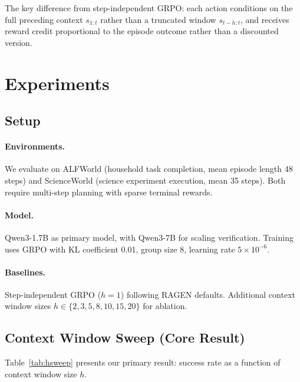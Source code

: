 \documentclass[11pt]{article}
\begin{document}
The key difference from step-independent GRPO: each action conditions on the full preceding context $s_{1:t}$ rather than a truncated window $s_{t-h:t}$, and receives reward credit proportional to the episode outcome rather than a discounted version.

\section{Experiments}

\subsection{Setup}

\paragraph{Environments.} We evaluate on ALFWorld (household task completion, mean episode length 48 steps) and ScienceWorld (science experiment execution, mean 35 steps). Both require multi-step planning with sparse terminal rewards.

\paragraph{Model.} Qwen3-1.7B as primary model, with Qwen3-7B for scaling verification. Training uses GRPO with KL coefficient 0.01, group size 8, learning rate $5 \times 10^{-6}$.

\paragraph{Baselines.} Step-independent GRPO ($h=1$) following RAGEN defaults. Additional context window sizes $h \in \{2, 3, 5, 8, 10, 15, 20\}$ for ablation.

\subsection{Context Window Sweep (Core Result)}

Table~\ref{tab:hsweep} presents our primary result: success rate as a function of context window size $h$.
\end{document}
